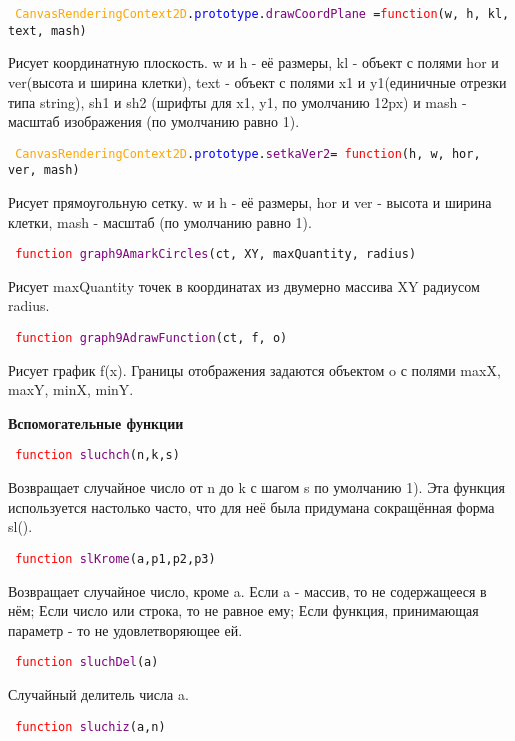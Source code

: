 \hypertarget{drawCoordPlane}{\texttt{
		\textcolor{Orange}{CanvasRenderingContext2D}.\textcolor{Blue}{prototype}.\textcolor{Purple}{drawCoordPlane }=\textcolor{Red}{function}(w, h, kl, text, mash)
	}}

Рисует координатную плоскость. w и h  \-- её размеры, kl \-- объект с полями hor и ver(высота и ширина клетки), text \-- объект с полями x1 и y1(единичные отрезки типа string), sh1 и sh2 (шрифты для x1, y1, по умолчанию 12px) и mash - масштаб изображения (по умолчанию равно 1).

\texttt{
	\textcolor{Orange}{CanvasRenderingContext2D}.\textcolor{Blue}{prototype}.\textcolor{Purple}{setkaVer2}=
	\newline
	\textcolor{Red}{function}(h, w, hor, ver, mash)
}

Рисует прямоугольную сетку. w и h  \-- её размеры, hor и ver \-- высота и ширина клетки, mash - масштаб (по умолчанию равно 1).

\hypertarget{graph9AmarkCircles}{\texttt{
		\textcolor{Red}{function} \textcolor{Purple}{graph9AmarkCircles}(ct, XY, maxQuantity, radius)
	}}

Рисует maxQuantity точек в координатах из двумерно массива XY радиусом radius.

\hypertarget{graph9AdrawFunction}{\texttt{
		\textcolor{Red}{function} \textcolor{Purple}{graph9AdrawFunction}(ct, f, o)
	}}

Рисует график f(x). Границы отображения задаются объектом o с полями maxX, maxY, minX, minY.

\textbf{Вспомогательные функции}

\hypertarget{sluchch}{\texttt{
		\textcolor{Red}{function} \textcolor{Purple}{sluchch}(n,k,s)
	}}

Возвращает случайное число от n до k с шагом s по умолчанию 1).
Эта функция используется настолько часто, что для неё была придумана сокращённая форма sl().

\hypertarget{slKrome}{\texttt{
		\textcolor{Red}{function} \textcolor{Purple}{slKrome}(a,p1,p2,p3)
	}}

Возвращает случайное число, кроме a. Если a \-- массив, то не содержащееся в нём; Если число или строка, то не равное ему; Если функция, принимающая параметр - то не удовлетворяющее ей.

\texttt{
	\textcolor{Red}{function} \textcolor{Purple}{sluchDel}(a)
}

Случайный делитель числа a.

\texttt{
	\textcolor{Red}{function} \textcolor{Purple}{sluchiz}(a,n)
}


